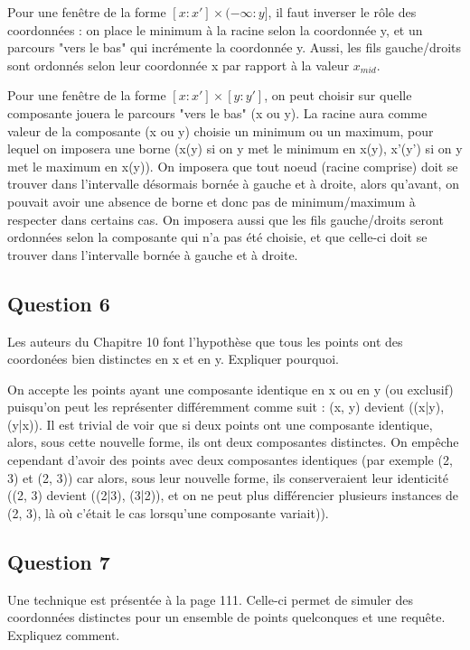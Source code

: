 \documentclass{article}
\newcommand{\black}{\color{black}}
\begin{document}
Pour une fenêtre de la forme $[x : x'] \times (- \infty : y]$, il faut inverser le rôle des coordonnées : on place le minimum à la racine selon la coordonnée y, et un parcours "vers le bas" qui
incrémente la coordonnée y. Aussi, les fils gauche/droits sont ordonnés selon leur coordonnée x par rapport à la valeur $x_{mid}$.

Pour une fenêtre de la forme $[x : x'] \times [y : y']$, on peut choisir sur quelle composante jouera le parcours "vers le bas" (x ou y). La racine aura comme valeur de la composante (x ou y) choisie
un minimum ou un maximum, pour lequel on imposera une borne (x(y) si on y met le minimum en x(y), x'(y') si on y met le maximum en x(y)). On imposera que tout noeud (racine comprise) doit se trouver dans l'intervalle désormais bornée
à gauche et à droite, alors qu'avant, on pouvait avoir une absence de borne et donc pas de minimum/maximum à respecter dans certains cas. On imposera aussi que les fils gauche/droits seront ordonnées selon la composante qui n'a
pas été choisie, et que celle-ci doit se trouver dans l'intervalle bornée à gauche et à droite.

\black

\newpage

\subsection{Question 6} Les auteurs du Chapitre 10 font l'hypothèse que tous les points ont des coordonées bien
distinctes en x et en y. Expliquer pourquoi.


\bigskip

On accepte les points ayant une composante identique en x ou en y (ou exclusif) puisqu'on peut les représenter différemment comme suit : (x, y) devient ((x|y), (y|x)). 
Il est trivial de voir que si deux points ont une composante identique, alors, sous cette nouvelle forme, ils ont deux composantes distinctes. 
On empêche cependant d'avoir des points avec deux composantes identiques (par exemple (2, 3) et (2, 3)) 
car alors, sous leur nouvelle forme, ils conserveraient leur identicité ((2, 3) devient ((2|3), (3|2)), et on ne peut plus différencier plusieurs instances de (2, 3), 
là où c'était le cas lorsqu'une composante variait)).



\subsection{Question 7} Une technique est présentée à la page 111. Celle-ci permet de simuler des coordonnées
distinctes pour un ensemble de points quelconques et une requête. Expliquez comment.
\end{document}
